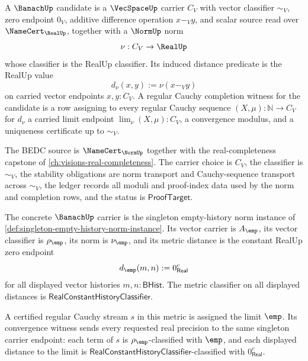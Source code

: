 \begin{definition}
\label{def:banach-complete-normed-carrier}
A $\BanachUp$ candidate is a $\VecSpaceUp$ carrier $C_V$ with vector
classifier $\sim_V$, zero endpoint $0_V$, additive difference operation
$x-_V y$, and scalar source read over $\NameCert_{\RealUp}$, together with a
$\NormUp$ norm
$$
\nu:C_V\to \RealUp
$$
whose classifier is the RealUp classifier. Its induced distance predicate is
the RealUp value
$$
d_\nu(x,y):=\nu(x-_V y)
$$
on carried vector endpoints $x,y:C_V$. A regular Cauchy completion witness for
the candidate is a row assigning to every regular Cauchy sequence
$(X,\mu):\mathbb{N}\to C_V$ for $d_\nu$ a carried limit endpoint
$\lim_\nu(X,\mu):C_V$, a convergence modulus, and a uniqueness certificate up
to $\sim_V$.

The BEDC source is $\NameCert_{\NormUp}$ together with the real-completeness
capstone of \autoref{ch:visions-real-completeness}. The carrier choice is
$C_V$, the classifier is $\sim_V$, the stability obligations are norm transport
and Cauchy-sequence transport across $\sim_V$, the ledger records all moduli and
proof-index data used by the norm and completion rows, and the status is
$\mathsf{ProofTarget}$.
\end{definition}

\begin{definition}
\label{def:banach-singleton-empty-history-instance}
The concrete $\BanachUp$ carrier is the singleton empty-history norm instance
of \autoref{def:singleton-empty-history-norm-instance}. Its vector carrier is
$A_{\emp}$, its vector classifier is $\rho_{\emp}$, its norm is
$\nu_{\emp}$, and its metric distance is the constant RealUp zero endpoint
$$
d_{\emp}(m,n):=0_{\mathsf{Real}}^{c}
$$
for all displayed vector histories $m,n:\mathsf{BHist}$. The metric
classifier on all displayed distances is
$\mathsf{RealConstantHistoryClassifier}$.

A certified regular Cauchy stream $s$ in this metric is assigned the limit
$\emp$. Its convergence witness sends every requested real precision to the
same singleton carrier endpoint: each term of $s$ is $\rho_{\emp}$-classified
with $\emp$, and each displayed distance to the limit is
$\mathsf{RealConstantHistoryClassifier}$-classified with
$0_{\mathsf{Real}}^{c}$.
\end{definition}

